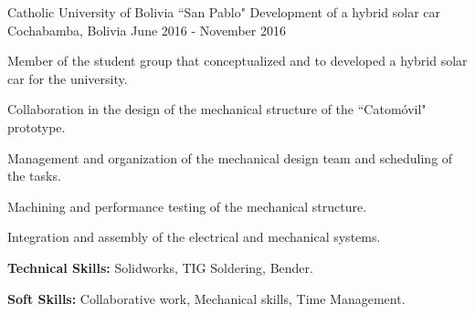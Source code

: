 

\begin{cventries}

  \cventry
    {Catholic University of Bolivia ``San Pablo"} %
    {Development of a hybrid solar car} %
    {Cochabamba, Bolivia} %
    {June 2016 - November 2016} %
    {
      \begin{cvitems} %
        \item {Member of the student group that conceptualized and to developed a hybrid solar car for the university.}
        \item {Collaboration in the design of the mechanical structure of the ``Catomóvil" prototype.}
        \item {Management and organization of the mechanical design team and scheduling of the tasks.}
        \item {Machining and performance testing of the mechanical structure.}
        \item {Integration and assembly of the electrical and mechanical systems.}
        \item {\textbf{Technical Skills:} Solidworks, TIG Soldering,
        Bender.}
        \item {\textbf{Soft Skills:} Collaborative work, Mechanical
        skills, Time Management.}
      \end{cvitems}
    }

\end{cventries}
